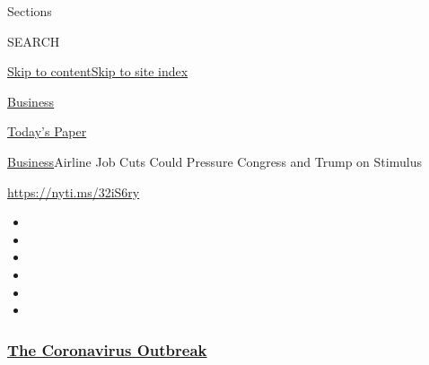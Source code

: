 Sections

SEARCH

\protect\hyperlink{site-content}{Skip to
content}\protect\hyperlink{site-index}{Skip to site index}

\href{https://www.nytimes3xbfgragh.onion/section/business}{Business}

\href{https://myaccount.nytimes3xbfgragh.onion/auth/login?response_type=cookie\&client_id=vi}{}

\href{https://www.nytimes3xbfgragh.onion/section/todayspaper}{Today's
Paper}

\href{/section/business}{Business}\textbar{}Airline Job Cuts Could
Pressure Congress and Trump on Stimulus

\url{https://nyti.ms/32iS6ry}

\begin{itemize}
\item
\item
\item
\item
\item
\item
\end{itemize}

\hypertarget{the-coronavirus-outbreak}{%
\subsubsection{\texorpdfstring{\href{https://www.nytimes3xbfgragh.onion/news-event/coronavirus?name=styln-coronavirus-markets\&region=TOP_BANNER\&block=storyline_menu_recirc\&action=click\&pgtype=Article\&impression_id=beea3560-f4cb-11ea-8c3b-3fc590030245\&variant=undefined}{The
Coronavirus
Outbreak}}{The Coronavirus Outbreak}}\label{the-coronavirus-outbreak}}

